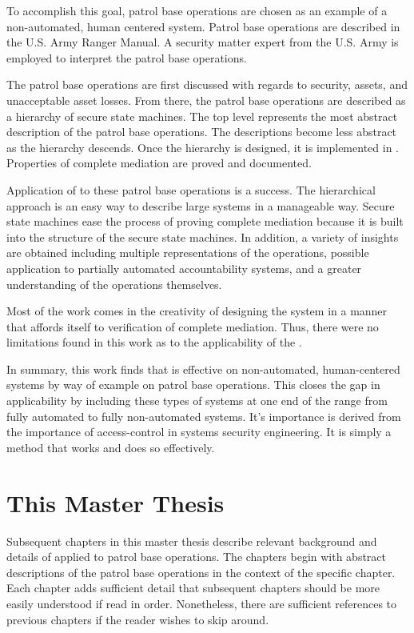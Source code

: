\documentclass[../../main/main.tex]{subfiles}
\begin{document}
To accomplish this goal, patrol base operations are chosen as an example of a non-automated, human centered system.  Patrol base operations are described in the U.S. Army Ranger Manual.  A security matter expert from the U.S. Army is employed to interpret the patrol base operations.  

The patrol base operations are first discussed with regards to security, assets, and unacceptable asset losses.  From there, the patrol base operations are described as a hierarchy of secure state machines.  The top level represents the most abstract description of the patrol base operations.  The descriptions become less abstract as the hierarchy descends.  Once the hierarchy is designed, it is implemented in .  Properties of complete mediation are proved and documented.  
 
Application of  to these patrol base operations is a success.   The hierarchical approach is an easy way to describe large systems in a manageable way. Secure state machines ease the process of proving complete mediation because it is built into the structure of the secure state machines.  In addition, a variety of insights are obtained including multiple representations of the operations, possible application to partially automated accountability systems, and a greater understanding of the operations themselves. 

 Most of the work comes in the creativity of designing the system in a manner that affords itself to verification of complete mediation.  Thus, there were no limitations found in this work as to the applicability of the . 


In summary, this work finds that  is effective on non-automated, human-centered systems by way of example on patrol base operations.  This closes the gap in  applicability by including these types of systems at one end of the range from fully automated to fully non-automated systems.  It's importance is derived from the importance of access-control in systems security engineering.  It is simply a method that works and does so effectively.  

\section{This Master Thesis}\label{sec:thismasterthesis}
Subsequent chapters in this master thesis describe relevant background and details of  applied to patrol base operations.  The chapters begin with abstract descriptions of the patrol base operations in the context of the specific chapter.  Each chapter adds sufficient detail that subsequent chapters should be more easily understood if read in order.  Nonetheless, there are sufficient references to previous chapters if the reader wishes to skip around.
\end{document}
